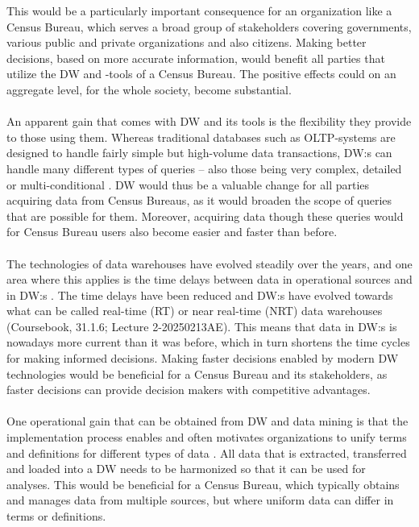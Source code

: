 This would be a particularly important consequence for an organization like a Census Bureau, 
which serves a broad group of stakeholders covering governments, 
various public and private organizations and also citizens. 
Making better decisions, based on more accurate information, would benefit all parties that utilize the DW and -tools of a Census Bureau. 
The positive effects could on an aggregate level, for the whole society, become substantial.
\\\\
An apparent gain that comes with DW and its tools is the flexibility they provide to those using them. 
Whereas traditional databases such as OLTP-systems are designed to handle fairly simple but high-volume data transactions, DW:s can handle many
different types of queries -- also those being very complex, detailed or multi-conditional \cite[chapter~31.1.4]{CourseLitt}. 
DW would thus be a valuable change for all parties acquiring data from Census Bureaus, 
as it would broaden the scope of queries that are possible for them. 
Moreover, acquiring data though these queries would for Census Bureau users also become easier and faster than before.
\\\\
The technologies of data warehouses have evolved steadily over the years, 
and one area where this applies is the time delays between data in operational sources and in DW:s \cite[chapter~31.1.6]{CourseLitt}. 
The time delays have been reduced and DW:s have evolved towards what can be called real-time (RT) or near real-time (NRT) data warehouses (Coursebook, 31.1.6; Lecture 2-20250213AE). 
This means that data in DW:s is nowadays more current than it was before, 
which in turn shortens the time cycles for making informed decisions. 
Making faster decisions enabled by modern DW technologies would be beneficial for a Census Bureau and its stakeholders, 
as faster decisions can provide decision makers with competitive advantages.
\\\\
One operational gain that can be obtained from DW and data mining is that the implementation process enables and often motivates organizations to
unify terms and definitions for different types of data \cite{l2video}. 
All data that is extracted, transferred and loaded into a DW needs to be harmonized so that it can be used for analyses. 
This would be beneficial for a Census Bureau, which typically obtains and manages data from multiple sources, 
but where uniform data can differ in terms or definitions. 
